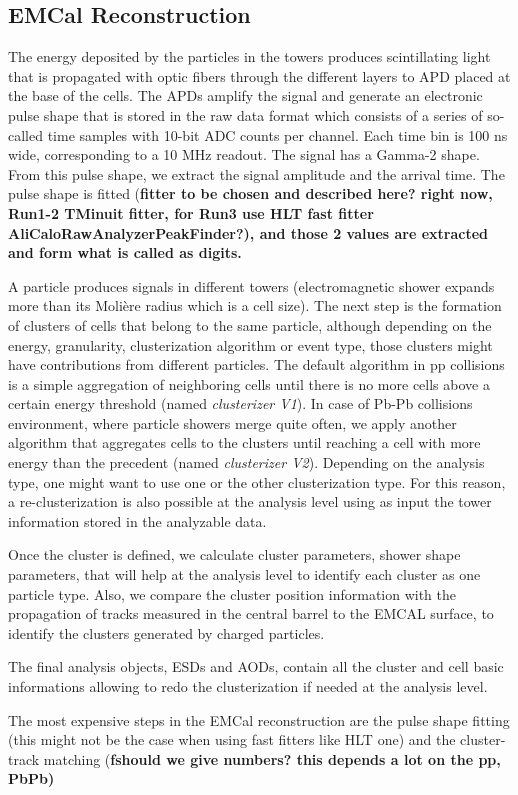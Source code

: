 \subsection{EMCal Reconstruction}

The energy deposited by the particles in the towers produces scintillating light that is propagated with optic fibers through the different layers to APD placed at the base of the cells. The APDs amplify the signal and generate an electronic pulse shape that is stored in the raw data format which consists of a series of so-called time samples with 10-bit ADC counts per channel. Each time bin is 100 ns wide, corresponding to a 10 MHz readout.
The signal has a Gamma-2 shape. From this pulse shape, we extract the signal amplitude and the arrival time. The pulse shape is fitted (\bf{fitter to be chosen and described here? right now, Run1-2 TMinuit fitter, for Run3 use  HLT fast fitter  AliCaloRawAnalyzerPeakFinder?}), and those 2 values are extracted and form what is called as digits.

A particle produces signals in different towers (electromagnetic shower expands more than its Moli\`ere radius which is a cell size). The next step is the formation of clusters of cells that belong to the same particle, although depending on the energy, granularity, clusterization algorithm or event type, those clusters might have contributions from different particles. The default algorithm in pp collisions is a simple aggregation of neighboring cells until there is no more cells above a certain energy threshold (named {\it clusterizer V1}). In case of Pb-Pb collisions environment, where particle showers merge quite often, we apply another algorithm that aggregates cells to the clusters until reaching a cell with more energy than the precedent (named {\it clusterizer V2}). Depending on the analysis type, one might want to use one or the other clusterization type. For this reason, a re-clusterization is also possible at the analysis level using as input the tower information stored in the analyzable data.

Once the cluster is defined, we calculate cluster parameters, shower shape parameters, that will help at the analysis level to identify each cluster as one particle type. Also, we compare the cluster position information with the propagation of tracks measured in the central barrel to the EMCAL surface, to identify the clusters generated by charged particles.

The final analysis objects, ESDs and AODs, contain all the cluster and cell basic informations allowing to redo the clusterization if needed at the analysis level.

The most expensive steps in the EMCal reconstruction are the pulse shape fitting  (this might not be the case when using fast fitters like HLT one) and the cluster-track matching (\bf{fshould we give numbers? this depends a lot on the pp, PbPb})

